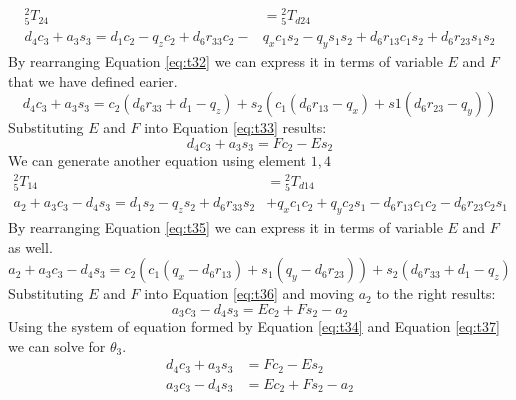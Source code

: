 \begin{equation} \label{eq:t32}
    \begin{aligned}
        {_5^{2}}T_{24}                                   & ={_5^{2}}T_{d24}                                        \\
        d_4c_3 + a_3s_3=d_1c_2 - q_zc_2 + d_6r_{33}c_2 - & q_xc_1s_2 - q_ys_1s_2 + d_6r_13c_1s_2 + d_6r_{23}s_1s_2
    \end{aligned}
\end{equation}
By rearranging Equation \ref{eq:t32} we can express it in terms of variable $E$ and $F$ that we have defined earier.
\begin{equation} \label{eq:t33}
    d_4c_3 + a_3s_3=c_2(d_6r_{33}+d_1-q_z)+s_2(c_1(d_6r_{13}-q_x) + s1(d_6r_{23}-q_y))
\end{equation}
Substituting $E$ and $F$ into Equation \ref{eq:t33} results:
\begin{equation} \label{eq:t34}
    d_4c_3 + a_3s_3=Fc_2-Es_2
\end{equation}
We can generate another equation using element $1,4$
\begin{equation} \label{eq:t35}
    \begin{aligned}
        {_5^{2}}T_{14}                                       & ={_5^{2}}T_{d14}                                            \\
        a_2 + a_3c_3 - d_4s_3=d_1s_2 - q_zs_2 + d_6r_{33}s_2 & + q_xc_1c_2 + q_yc_2s_1 - d_6r_{13}c_1c_2 - d_6r_{23}c_2s_1
    \end{aligned}
\end{equation}
By rearranging Equation \ref{eq:t35} we can express it in terms of variable $E$ and $F$ as well.
\begin{equation} \label{eq:t36}
    a_2 + a_3c_3 - d_4s_3=c_2(c_1(q_x-d_6r_{13}) + s_1(q_y-d_6r_{23})) + s_2(d_6r_{33}+d_1-q_z)
\end{equation}
Substituting $E$ and $F$ into Equation \ref{eq:t36} and moving $a_2$ to the right results:
\begin{equation} \label{eq:t37}
    a_3c_3 - d_4s_3=Ec_2+Fs_2-a_2
\end{equation}
Using the system of equation formed by Equation \ref{eq:t34} and Equation \ref{eq:t37} we can solve for $\theta_3$.
\begin{equation} \label{eq:t38}
    \begin{aligned}
        d_4c_3 + a_3s_3 & =Fc_2-Es_2     \\
        a_3c_3 - d_4s_3 & =Ec_2+Fs_2-a_2
    \end{aligned}
\end{equation}

